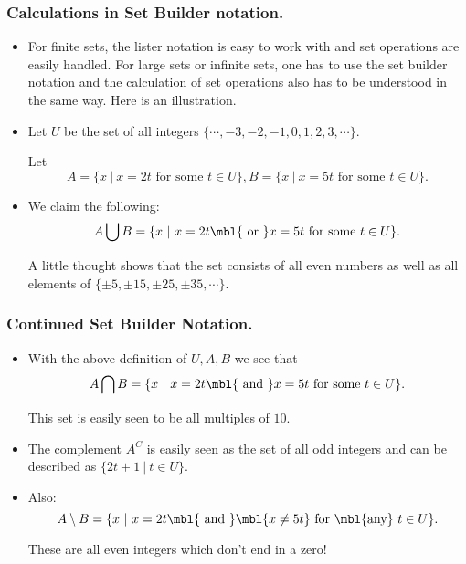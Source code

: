 %


\begin{frame}%
  \frametitle{Calculations in Set Builder notation.}
  \begin{itemize}%
 
\item For finite sets, the lister notation is easy to work with and set
operations are easily handled. For large sets or infinite sets, one has
to use the set builder notation and the calculation of set operations
also has to be understood in the same way. Here is an illustration.

\item Let $U$ be the set of all integers $\{ \cdots,
-3,-2,-1,0,1,2,3,\cdots \}.$

Let
$$A = \{ x ~|~ x=2t \mbox{ for some $t\in U$} \},
B= \{x ~|~ x=5t \mbox{ for some $t\in U$} \}.$$

\item We claim the following:
$$A \bigcup B = \{ x ~|~ x = 2t \mbl{\mbox{ or }} x=5t  \mbox{ for some $t\in
U$}\}.$$

A little thought shows that the set consists of all even numbers as well
as all elements of $\{\pm 5, \pm 15, \pm 25, \pm 35 ,\cdots \}$.

\end{itemize}
\pause
\end{frame}

%


\begin{frame}%
  \frametitle{Continued Set Builder Notation.}
  \begin{itemize}%
 
\item With the above definition of $U,A,B$ we see that
$$A\bigcap B = \{x ~|~ x = 2t \mbl{\mbox{ and }} x=5t  \mbox{ for some $t\in
U$}\}.$$

 This set is easily seen to be all multiples of $10$.

\item
The complement $A^C$ is easily seen as the set of all odd integers and
can be described as $\{2t+1~|~ t\in U\}$.

\item Also:
$$A\setminus  B = \{x ~|~ x = 2t \mbl{\mbox{ and }} \mbl{x\neq 5t}
\mbox{ for \mbl{any} $t\in U$}\}.$$

These are all even integers which don't end in a zero!
\end{itemize}
\pause
\end{frame}

